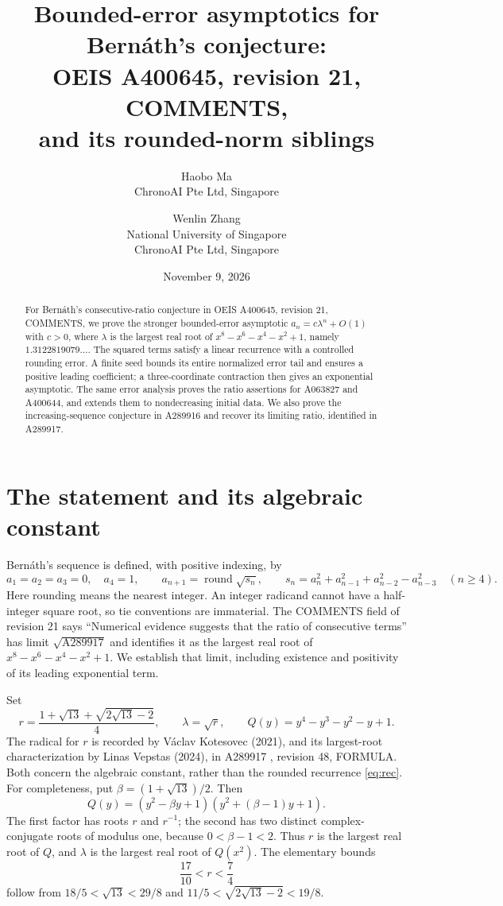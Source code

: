 \documentclass[11pt]{article}
\title{Bounded-error asymptotics for Bern\'ath's conjecture:\\
OEIS A400645, revision 21, COMMENTS,\\
and its rounded-norm siblings}
\author{Haobo Ma\\\small ChronoAI Pte Ltd, Singapore
\and Wenlin Zhang\\\small National University of Singapore\\
\small ChronoAI Pte Ltd, Singapore}
\date{November 9, 2026}
\begin{document}
\maketitle
\begin{abstract}
For Bern\'ath's consecutive-ratio conjecture in OEIS A400645,
revision 21, COMMENTS, we prove the stronger bounded-error asymptotic
$a_n=c\lambda^n+O(1)$ with $c>0$, where $\lambda$ is the largest real
root of $x^8-x^6-x^4-x^2+1$, namely $1.3122819079\ldots$.
The squared terms satisfy a linear recurrence with a controlled rounding
error. A finite seed bounds its entire normalized error tail and ensures
a positive leading coefficient; a three-coordinate contraction then gives
an exponential asymptotic. The same error analysis proves the ratio
assertions for A063827 and A400644, and extends them to nondecreasing
initial data. We also prove the increasing-sequence conjecture in
A289916 and recover its limiting ratio, identified in A289917.
\end{abstract}

\section{The statement and its algebraic constant}
Bern\'ath's sequence \cite{bernath} is defined, with positive indexing, by
\begin{equation}\label{eq:rec}
 a_1=a_2=a_3=0,\quad a_4=1,\qquad
 a_{n+1}=\operatorname{round}\sqrt{s_n},\qquad
 s_n=a_n^2+a_{n-1}^2+a_{n-2}^2-a_{n-3}^2\quad(n\ge4).
\end{equation}
Here rounding means the nearest integer. An integer radicand cannot have
a half-integer square root, so tie conventions are immaterial.
The COMMENTS field of revision 21 says ``Numerical evidence suggests
that the ratio of consecutive terms'' has limit $\sqrt{\mathrm{A289917}}$
and identifies it as the largest real root of
$x^8-x^6-x^4-x^2+1$. We establish that limit,
including existence and positivity of its leading exponential term.

Set
\begin{equation}\label{eq:constant}
 r=\frac{1+\sqrt{13}+\sqrt{2\sqrt{13}-2}}4,
 \qquad \lambda=\sqrt r,\qquad Q(y)=y^4-y^3-y^2-y+1.
\end{equation}
The radical for $r$ is recorded by V\'aclav Kotesovec (2021), and its
largest-root characterization by Linas Vepstas (2024), in A289917
\cite{constant}, revision 48, FORMULA. Both concern the algebraic
constant, rather than the rounded recurrence \eqref{eq:rec}.
For completeness, put $\beta=(1+\sqrt{13})/2$. Then
\[
 Q(y)=(y^2-\beta y+1)(y^2+(\beta-1)y+1).
\]
The first factor has roots $r$ and $r^{-1}$; the second has two distinct
complex-conjugate roots of modulus one, because $0<\beta-1<2$.
Thus $r$ is the largest real root of $Q$, and $\lambda$ is the largest
real root of $Q(x^2)$. The elementary bounds
\begin{equation}\label{eq:rbound}
 \frac{17}{10}<r<\frac74
\end{equation}
follow from $18/5<\sqrt{13}<29/8$ and
$11/5<\sqrt{2\sqrt{13}-2}<19/8$.
\end{document}
